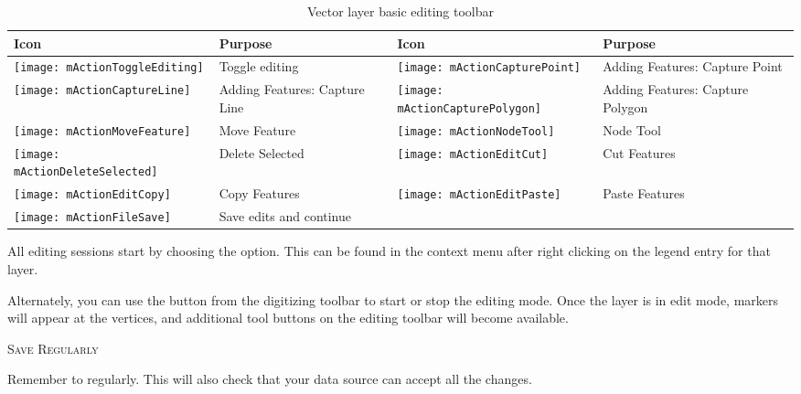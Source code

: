 \begin{table}[ht]
\centering
\begin{tabular}{|l|p{5.5cm}|l|p{5.5cm}|}
\hline \textbf{Icon} & \textbf{Purpose} & \textbf{Icon} & \textbf{Purpose} \\
\hline \texttt{[image: mActionToggleEditing]}
   & Toggle editing
   & \texttt{[image: mActionCapturePoint]}
   & Adding Features: Capture Point \\
\hline \texttt{[image: mActionCaptureLine]}
   & Adding Features: Capture Line
   & \texttt{[image: mActionCapturePolygon]}
   & Adding Features: Capture Polygon \\
\hline \texttt{[image: mActionMoveFeature]}
   & Move Feature
   & \texttt{[image: mActionNodeTool]}
   & Node Tool \\
\hline \texttt{[image: mActionDeleteSelected]}
   & Delete Selected
   & \texttt{[image: mActionEditCut]}
   & Cut Features \\
\hline \texttt{[image: mActionEditCopy]}
   & Copy Features
   & \texttt{[image: mActionEditPaste]}
   & Paste Features \\
\hline \texttt{[image: mActionFileSave]}
   & Save edits and continue
   &  &  \\
\hline
\end{tabular}
\caption{Vector layer basic editing toolbar}\label{tab:vector_editing}\medskip
\end{table}

All editing sessions start by choosing the
 option.
This can be found in the context menu after right clicking on the legend
entry for that layer.

Alternately, you can use the 
 button from the digitizing
toolbar to start or stop the editing mode. Once the
layer is in edit mode, markers will appear at the vertices, and additional
tool buttons on the editing toolbar will become available.

\begin{Tip}\caption{\textsc{Save Regularly}}
Remember to  regularly. This will
also check that your data source can accept all the changes.
\end{Tip}

